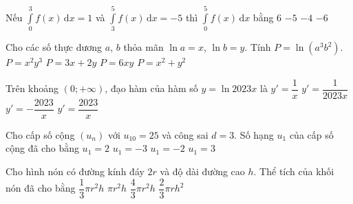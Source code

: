 \begin{ex}%
	Nếu $\displaystyle\int\limits_0^3 f(x) \mathrm{\,d}x=1$ và $\displaystyle\int\limits_3^5 f(x) \mathrm{\,d}x=-5$ thì $\displaystyle\int\limits_0^5 f(x) \mathrm{\,d}x$ bằng
	\choice
	{$6$}
	{$-5$}
	{\True $-4$}
	{$-6$}
\end{ex}
\begin{ex}%
	Cho các số thực dương $a$, $b$ thỏa mãn $\ln a=x$, $\ln b=y$. Tính $P=\ln \left(a^3b^2\right)$.
	\choice
	{$P=x^2y^3$}
	{\True $P=3x+2y$}
	{$P=6xy$}
	{$P=x^2+y^2$}
\end{ex}
\begin{ex}%
	Trên khoảng $(0;+\infty)$, đạo hàm của hàm số $y=\ln 2023x$ là
	\choice
	{\True $y'=\dfrac{1}{x}$}
	{$y'=\dfrac{1}{2023x}$}
	{$y'=-\dfrac{2023}{x}$}
	{$y'=\dfrac{2023}{x}$}
\end{ex}
\begin{ex}%
	Cho cấp số cộng $(u_n)$ với $u_{10}=25$ và công sai $d=3$. Số hạng $u_1$ của cấp số cộng đã  cho bằng
	\choice
	{$u_1=2$}
	{$u_1=-3$}
	{\True $u_1=-2$}
	{$u_1=3$}
\end{ex}

\begin{ex}%
	Cho hình nón có đường kính đáy $2r$ và độ dài đường cao $h$. Thể tích của khối nón đã cho bằng
	\choice
	{\True $\dfrac{1}{3}\pi r^2 h$}
	{$\pi r^2 h$}
	{$\dfrac{4}{3}\pi r^2 h$}
	{$\dfrac{2}{3}\pi r h^2$}
\end{ex}

